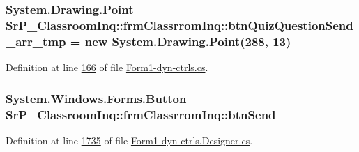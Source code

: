 \hypertarget{class_sr_p___classroom_inq_1_1frm_classrrom_inq_a8dcbe5ae5d44d445994571c17345e756}{
\subsubsection[{btn\-Quiz\-Question\-Send\-\_\-arr\-\_\-tmp}]{\setlength{\rightskip}{0pt plus 5cm}\-System.\-Drawing.\-Point {\bf \-Sr\-P\-\_\-\-Classroom\-Inq\-::frm\-Classrrom\-Inq\-::btn\-Quiz\-Question\-Send\-\_\-arr\-\_\-tmp} = new \-System.\-Drawing.\-Point(288, 13)}}
\label{class_sr_p___classroom_inq_1_1frm_classrrom_inq_a8dcbe5ae5d44d445994571c17345e756}


\-Definition at line \hyperlink{_form1-dyn-ctrls_8cs_source_l00166}{166} of file \hyperlink{_form1-dyn-ctrls_8cs_source}{\-Form1-\/dyn-\/ctrls.\-cs}.

\hypertarget{class_sr_p___classroom_inq_1_1frm_classrrom_inq_a5a1b78305ac1e8f7eb40a5d135fa3525}{
\subsubsection[{btn\-Send}]{\setlength{\rightskip}{0pt plus 5cm}\-System.\-Windows.\-Forms.\-Button {\bf \-Sr\-P\-\_\-\-Classroom\-Inq\-::frm\-Classrrom\-Inq\-::btn\-Send}}}
\label{class_sr_p___classroom_inq_1_1frm_classrrom_inq_a5a1b78305ac1e8f7eb40a5d135fa3525}


\-Definition at line \hyperlink{_form1-dyn-ctrls_8_designer_8cs_source_l01735}{1735} of file \hyperlink{_form1-dyn-ctrls_8_designer_8cs_source}{\-Form1-\/dyn-\/ctrls.\-Designer.\-cs}.

